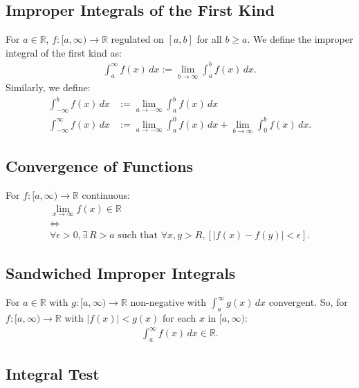 \documentclass[a4paper, 12pt, twoside]{article}
\begin{document}
\subsection{Improper Integrals of the First Kind}

For $a \in \mathbb{R}$, $f:[a, \infty) \to \mathbb{R}$ regulated
on $[a, b]$ for all $b \geq a$. We define the improper integral 
of the first kind as:
\begin{align*}
      \int_a^\infty f(x) \, dx := \lim_{b\to\infty}\int_a^b f(x) \, dx.
\end{align*}
Similarly, we define:
\begin{align*}
      \int_{-\infty}^b f(x) \, dx &:= \lim_{a\to-\infty}\int_a^b f(x) \, dx \\
      \int_{-\infty}^{\infty} f(x) \, dx &:=
            \lim_{a\to-\infty}\int_a^0 f(x) \, dx
            + \lim_{b\to\infty}\int_0^b f(x) \, dx.
\end{align*}

\subsection{Convergence of Functions}

For $f:[a, \infty) \to \mathbb{R}$ continuous:
\begin{gather*}
      \lim_{x\to\infty}f(x) \in \mathbb{R} \\
      \Leftrightarrow \\
      \forall \epsilon > 0, \exists \, R > a \text{ such that }
      \forall x, y > R, [|f(x) - f(y)| < \epsilon].
\end{gather*}

\newpage

\subsection{Sandwiched Improper Integrals}

For $a \in \mathbb{R}$ with $g: [a, \infty) \to \mathbb{R}$ 
non-negative with $\int_a^\infty g(x) \, dx$ convergent. So, for
$f: [a, \infty) \to \mathbb{R}$ with $|f(x)| < g(x)$ for each $x$ in
$[a, \infty)$:
\begin{align*}
      \int_a^\infty f(x) \, dx \in \mathbb{R}.
\end{align*}

\subsection{Integral Test}
\end{document}
